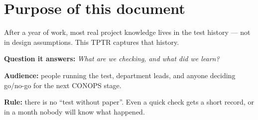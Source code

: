\section{Purpose of this document}

After a year of work, most real project knowledge lives in the test history
--- not in design assumptions. This TPTR captures that history.

\noindent\textbf{Question it answers:} \emph{What are we checking, and what did
we learn?}

\noindent\textbf{Audience:} people running the test, department leads, and
anyone deciding go/no-go for the next CONOPS stage.

\noindent\textbf{Rule:} there is no ``test without paper''. Even a quick check
gets a short record, or in a month nobody will know what happened.

